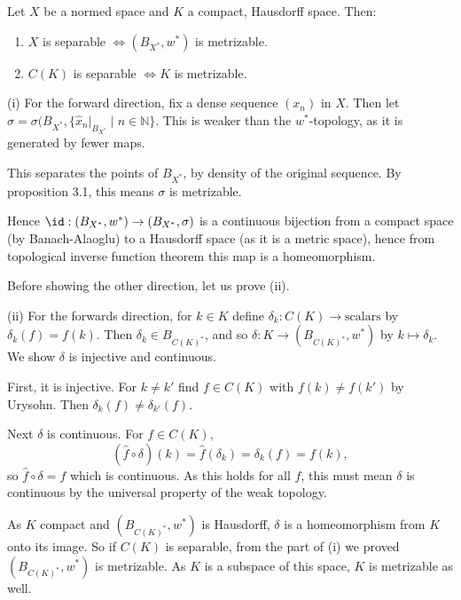 \documentclass[12pt]{article}
\begin{document}
\begin{proposition}
	Let $X$ be a normed space and $K$ a compact, Hausdorff space. Then:
	\begin{enumerate}[\normalfont(i)]
		\item $X$ is separable $\iff (B_{X^{\ast}}, w^{\ast})$ is metrizable.
		\item $C(K)$ is separable $\iff K$ is metrizable.
	\end{enumerate}
\end{proposition}

\begin{proofbox}
	
	
	(i) For the forward direction, fix a dense sequence $(x_n)$ in $X$. Then let $\sigma = \sigma(B_{X^{\ast}}, \{\hat x_n|_{B_{X^{\ast}}} \mid n \in \mathbb{N}\}$. This is weaker than the $w^{\ast}$-topology, as it is generated by fewer maps.

	This separates the points of $B_{X^{\ast}}$, by density of the original sequence. By proposition 3.1, this means $\sigma$ is metrizable.

	Hence $\id : (B_{X^{\ast}}, w^{\ast}) \to (B_{X^{\ast}}, \sigma)$ is a continuous bijection from a compact space (by Banach-Alaoglu) to a Hausdorff space (as it is a metric space), hence from topological inverse function theorem this map is a homeomorphism.

	Before showing the other direction, let us prove (ii).

	(ii) For the forwards direction, for $k \in K$ define $\delta_k : C(K) \to \text{scalars}$ by $\delta_k(f) = f(k)$. Then $\delta_k \in B_{C(K)^{\ast}}$, and so $\delta : K \to (B_{C(K)^{\ast}}, w^{\ast})$ by $k \mapsto \delta_k$. We show $\delta$ is injective and continuous.

	First, it is injective. For $k \neq k'$ find $f \in C(K)$ with $f(k) \neq f(k')$ by Urysohn. Then $\delta_k(f) \neq \delta_{k'}(f)$.

	Next $\delta$ is continuous. For $f \in C(K)$,
	\[
		(\hat f \circ \delta)(k) = \hat f(\delta_k) = \delta_k(f) = f(k),
	\]
	so $\hat f \circ \delta = f$ which is continuous. As this holds for all $f$, this must mean $\delta$ is continuous by the universal property of the weak topology.

	As $K$ compact and $(B_{C(K)^{\ast}}, w^{\ast})$ is Hausdorff, $\delta$ is a homeomorphism from $K$ onto its image. So if $C(K)$ is separable, from the part of (i) we proved $(B_{C(K)^{\ast}}, w^{\ast})$ is metrizable. As $K$ is a subspace of this space, $K$ is metrizable as well.


\end{proofbox}
\end{document}
